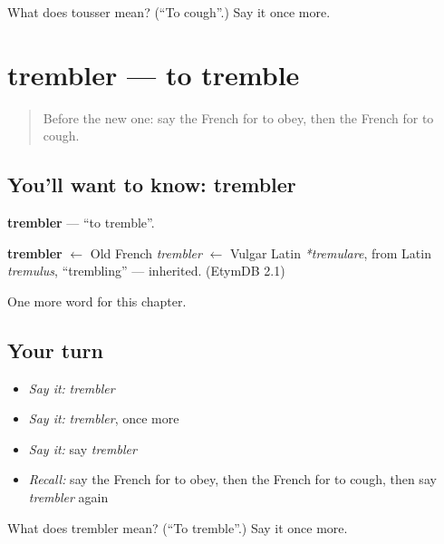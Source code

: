 \begin{tcolorbox}[breakable,colback=teal!4,colframe=teal!35!black,title={Before you move on}]
What does tousser mean? (\textquotedblleft{}To cough\textquotedblright{}.) Say it once more.
\end{tcolorbox}
\section[trembler]{trembler — to tremble}

\label{lesson:FR-C241-trembler}



\begin{quote}
Before the new one: say the French for to obey, then the French for to cough.
\end{quote}

\subsection*{You'll want to know: trembler}
\textbf{trembler} — \textquotedblleft{}to tremble\textquotedblright{}.

\begin{cousinweb}
\textbf{trembler} $\leftarrow$ Old French \emph{trembler} $\leftarrow$ Vulgar Latin \emph{*tremulare}, from Latin \emph{tremulus}, \textquotedblleft{}trembling\textquotedblright{} — inherited. (EtymDB 2.1)
\end{cousinweb}

\begin{grammarlens}[title={What you've built}]
One more word for this chapter.
\end{grammarlens}

\subsection*{Your turn}
\begin{itemize}
\raggedright
  \item \emph{Say it:} \emph{trembler}
  \item \emph{Say it:} \emph{trembler}, once more
  \item \emph{Say it:} say \emph{trembler}
  \item \emph{Recall:} say the French for to obey, then the French for to cough, then say \emph{trembler} again
\end{itemize}

\begin{tcolorbox}[breakable,colback=teal!4,colframe=teal!35!black,title={Before you move on}]
What does trembler mean? (\textquotedblleft{}To tremble\textquotedblright{}.) Say it once more.
\end{tcolorbox}
